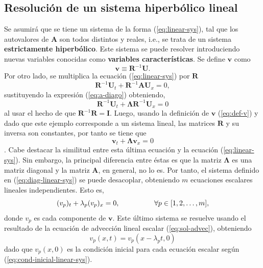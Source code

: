 \subsection{Resolución de un sistema hiperbólico lineal}
Se asumirá que se tiene un sistema de la forma (\ref{eq:linear-sys}), tal que los autovalores de $\mathbf{A}$ son todos distintos y reales, i.e., se trata de un sistema \textbf{estrictamente hiperbólico}. Este sistema se puede resolver introduciendo nuevas variables conocidas como \textbf{variables características}. Se define $\mathbf{v}$ como
\begin{equation}
	\mathbf{v} \equiv \mathbf{R}^{-1} \mathbf{U}.
	\label{eq:def-v}
\end{equation}
Por otro lado, se multiplica la ecuación (\ref{eq:linear-sys}) por $\mathbf{R}$
\begin{equation}
	\mathbf{R}^{-1}\mathbf{U}_t + \mathbf{R}^{-1} \mathbf{A} \mathbf{U}_x = 0,
\end{equation}
sustituyendo la expresión (\ref{eq:a-diago}) obteniendo,
\begin{equation}
	\mathbf{R}^{-1}\mathbf{U}_t + \mathbf{\Lambda} \mathbf{R}^{-1} \mathbf{U}_x = 0
\end{equation}
al usar el hecho de que $\mathbf{R}^{-1} \mathbf{R} = \mathbf{I}$. Luego, usando la definición de $\mathbf{v}$ (\ref{eq:def-v}) y dado que este ejemplo corresponde a un sistema lineal, las matrices $\mathbf{R}$ y su inversa son constantes, por tanto se tiene que
\begin{equation}
	\mathbf{v}_t + \mathbf{\Lambda} \mathbf{v}_x = 0
	\label{eq:diag-linear-sys}
\end{equation}.
Cabe destacar la similitud entre esta última ecuación y la ecuación (\ref{eq:linear-sys}). Sin embargo, la principal diferencia entre éstas es que la matriz $\mathbf{\Lambda}$ es una matriz diagonal y la matriz $\mathbf{A}$, en general, no lo es. Por tanto, el sistema definido en (\ref{eq:diag-linear-sys}) se puede desacoplar, obteniendo $m$ ecuaciones escalares lineales independientes. Esto es,
\begin{equation}
	(v_p)_t + \lambda_{p} (v_{p})_x = 0, \hspace{17mm} \forall p \in [1,2, \dots, m],
\end{equation}
donde $v_p$ es cada componente de $\mathbf{v}$. Este último sistema se resuelve usando el resultado de la ecuación de advección lineal escalar (\ref{eq:sol-advec}), obteniendo
\begin{equation}
	v_p(x,t) = v_p(x - \lambda_{p}t, 0)
	\label{eq:v-sub-p}
\end{equation}
dado que $v_p(x, 0)$ es la condición inicial para cada ecuación escalar según (\ref{eq:cond-inicial-linear-sys}).


